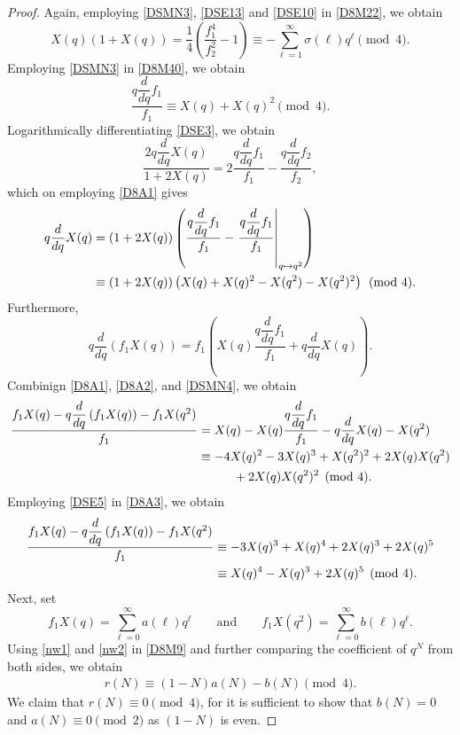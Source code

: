 \documentclass[12pt]{article}
\numberwithin{equation}{section}
\theoremstyle{definition}
\theoremstyle{remark}
\numberwithin{equation}{section}
\begin{document}
\begin{proof}
Again, employing  \eqref{DSMN3},  \eqref{DSE13} and \eqref{DSE10}
 in \eqref{D8M22}, we obtain
\begin{equation}\label{D8M40}
X(q)(1+X(q))
=
\dfrac{1}{4}
\left(
\dfrac{f_1^4}{f_2^2}-1
\right)\equiv
-\sum_{\ell=1}^{\infty}\sigma(\ell)q^\ell
\pmod{4}.
\end{equation}
Employing \eqref{DSMN3} in \eqref{D8M40}, we obtain
\begin{equation}\label{D8A1}
\dfrac{q\dfrac{d}{dq}f_1}{f_1}
\equiv X(q)+X(q)^2
\pmod{4}.
\end{equation}
Logarithmically differentiating \eqref{DSE3}, we obtain
$$\dfrac{2q\dfrac{d}{dq}X(q)}{1+2X(q)}
=
2\dfrac{q\dfrac{d}{dq}f_1}{f_1}
-\dfrac{q\dfrac{d}{dq} f_2}{f_2}, $$
which on employing \eqref{D8A1} gives
\begin{align}
 q\dfrac{d}{dq}   X(q)
&=
\left(1+2X(q)\right)
\left(
\dfrac{q\dfrac{d}{dq}f_1}{f_1}
-
\left.
\dfrac{ q\dfrac{d}{dq}f_1}{f_1}
\right|_{q\mapsto q^2}
\right) \notag\\
&\label{D8A2}\equiv
\left(1+2X(q)\right)
\left(
X(q)+X(q)^2-X(q^2)-X(q^2)^2
\right)
\pmod{4}.
\end{align}
Furthermore,
\begin{equation}\label{DSMN4}
q\dfrac{d}{dq}\left(f_1X(q)\right)
=
f_1\left(
X(q)\dfrac{ q\dfrac{d}{dq}f_1}{f_1}
+  q\dfrac{d}{dq}X(q)
\right).    
\end{equation}
Combinign \eqref{D8A1}, \eqref{D8A2}, and \eqref{DSMN4}, we obtain
\begin{align}
	\dfrac{
		f_1X(q)-q\dfrac{d}{dq}\left(f_1X(q)\right)-f_1X(q^2)
	}{f_1}
	&=
	X(q)-X(q)\dfrac{q\dfrac{d}{dq} f_1}{f_1}
	-q\dfrac{d}{dq}X(q)-X(q^2) \notag\\
	&\label{D8A3}\equiv
	-4X(q)^2-3X(q)^3+X(q^2)^2
	+2X(q)X(q^2)\notag\\
	&\hspace{1cm}+2X(q)X(q^2)^2
	\pmod{4}.
\end{align}
Employing \eqref{DSE5} in \eqref{D8A3}, we obtain
\begin{align}
\dfrac{
f_1X(q)-q\dfrac{d}{dq}\left(f_1X(q)\right)-f_1X(q^2)
}{f_1}
&\equiv
-3X(q)^3+X(q)^4+2X(q)^3+2X(q)^5\notag\\
&\label{nw1}\equiv
X(q)^4-X(q)^3+2X(q)^5
\pmod{4}.
\end{align}
Next, set
\begin{equation}\label{nw2}
f_1X(q)=\sum_{\ell=0}^{\infty}a(\ell)q^\ell
\qquad\mbox{and}\qquad 
f_1X(q^2)=\sum_{\ell=0}^{\infty}b(\ell)q^\ell.
\end{equation}
Using \eqref{nw1} and \eqref{nw2} in \eqref{D8M9} and further comparing the coefficient of $q^N$ from both sides, we obtain
\begin{align*}
r(N)\equiv
(1-N)a(N)
-b(N)
\pmod{4}.
\end{align*}
We claim that $r(N)\equiv 0\pmod 4$, for it is sufficient to show that $b(N)=0$ and $a(N)\equiv 0\pmod 2$ as $(1-N)$ is even. 


\end{proof}
\end{document}
